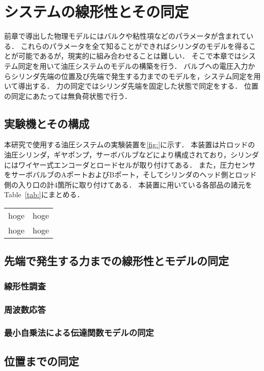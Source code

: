 \chapter{システムの線形性とその同定}
前章で導出した物理モデルにはバルクや粘性項などのパラメータが含まれている．
これらのパラメータを全て知ることができればシリンダのモデルを得ることが可能であるが，現実的に組み合わせることは難しい．
そこで本章ではシステム同定を用いて油圧システムのモデルの構築を行う．
バルブへの電圧入力からシリンダ先端の位置及び先端で発生する力までのモデルを，システム同定を用いて導出する．
力の同定ではシリンダ先端を固定した状態で同定をする．
位置の同定にあたっては無負荷状態で行う．
\section{実験機とその構成}
本研究で使用する油圧システムの実験装置を\figname\ref{fig:}に示す．
本装置は片ロッドの油圧シリンダ，ギヤポンプ，サーボバルブなどにより構成されており，シリンダにはワイヤー式エンコーダとロードセルが取り付けてある．
また，圧力センサをサーボバルブのAポートおよびBポート，そしてシリンダのヘッド側とロッド側の入り口の計4箇所に取り付けてある．
本装置に用いている各部品の諸元をTable~\ref{tab:}にまとめる．

\begin{table}[t]
    \begin{tabular}{|c|c|}
        hoge & hoge\\
        hoge & hoge
    \end{tabular}
\end{table}


\section{先端で発生する力までの線形性とモデルの同定}
\subsection{線形性調査}
\subsection{周波数応答}
\subsection{最小自乗法による伝達関数モデルの同定}
\section{位置までの同定}
